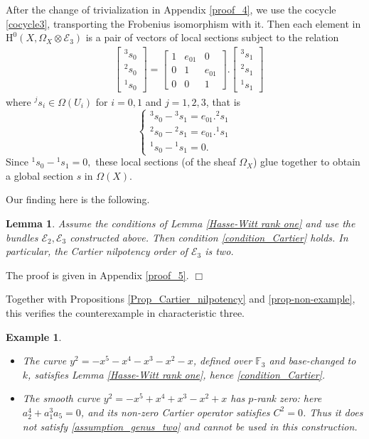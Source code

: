\documentclass[12pt,a4]{amsart}
\newtheorem{lem}[claim]{Lemma}
\newtheorem{example}[claim]{Example}
\theoremstyle{definition}
\begin{document}
After the change of trivialization in Appendix \ref{proof_4}, we use
the cocycle \eqref{cocycle3}, transporting the Frobenius isomorphism with it.
Then each element in 
$\mathrm{H}^0(X,\Omega_X \otimes\mathcal  E_3)$ is a pair of vectors   
of local sections subject to the relation
\begin{align*}
& \begin{bmatrix} 
{}^3s_0 \\ {}^2s_0 \\ {}^1s_0 \end{bmatrix} =\begin{bmatrix}
1 & e_{01} & 0 \\  0 & 1 & e_{01} \\ 0 & 0 & 1
\end{bmatrix}. \begin{bmatrix} {}^3s_1 \\ {}^2s_1 \\ {}^1s_1 \end{bmatrix}
\end{align*}
where ${}^j\!s_i\in\Omega(U_i)$ for $i=0,1$ and $j=1,2,3$, that is 
$$ \begin{cases} {}^3s_0 - {}^3s_1 = e_{01}. {}^2s_1 \\ {}^2s_0 - {}^2s_1 = e_{01}. {}^1s_1 \\ {}^1s_0 - {}^1s_1 = 0. \end{cases} $$
Since ${}^1s_0 - {}^1s_1 = 0,$ these local sections (of the sheaf $\Omega_X$) glue together to obtain a global section $s$ in $\Omega(X).$ 

 
Our finding here is the following.
\begin{lem}\label{lem_C_E3}
Assume the conditions of Lemma \ref{Hasse-Witt rank one} and use the
bundles $\mathcal E_2,\mathcal E_3$ constructed above.
Then condition \eqref{condition_Cartier} holds. In particular, the
Cartier nilpotency order of $\mathcal E_3$ is two.
\end{lem}
\noindent The proof is given in Appendix \ref{proof_5}. \hfill $\Box$

Together with Propositions \ref{Prop_Cartier_nilpotency} and
\ref{prop-non-example}, this verifies the counterexample in characteristic three.

\begin{example}\label{example 5.11}
\begin{itemize}
\item[(i)] The curve
$y^2=-x^5-x^4-x^3-x^2-x$, defined over $\mathbb F_3$ and base-changed
to $k$, satisfies Lemma \ref{Hasse-Witt rank one}, hence
\eqref{condition_Cartier}.
\item[(ii)] The smooth curve
$y^2=-x^5+x^4+x^3-x^2+x$ has $p$-rank zero:
here $a_2^4+a_1^3a_5=0$, and its non-zero Cartier operator satisfies $C^2=0$.
Thus it does not satisfy \eqref{assumption_genus_two} and cannot be used
in this construction.
\end{itemize}
\end{example}
\end{document}
